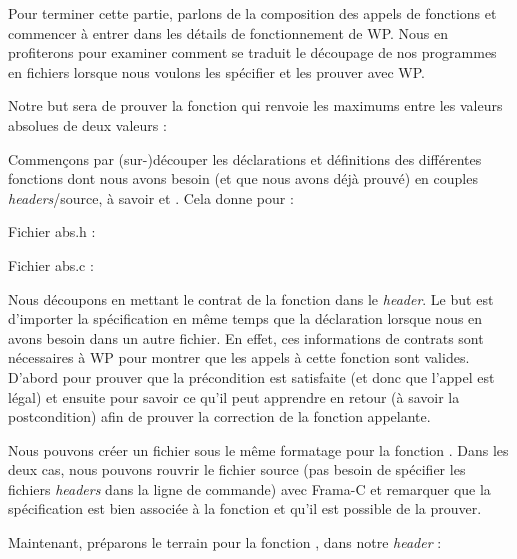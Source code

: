 Pour terminer cette partie, parlons de la composition des appels de
fonctions et commencer à entrer dans les détails de fonctionnement de WP. Nous
en profiterons pour examiner comment se traduit le découpage de nos
programmes en fichiers lorsque nous voulons les spécifier et les prouver avec WP.



Notre but sera de prouver la fonction  qui renvoie les maximums
entre les valeurs absolues de deux valeurs :






Commençons par (sur-)découper les déclarations et définitions des différentes
fonctions dont nous avons besoin (et que nous avons déjà prouvé) en couples
\textit{headers}/source, à savoir  et . Cela donne
pour  :



Fichier abs.h :



Fichier abs.c :




Nous découpons en mettant le contrat de la fonction dans le \textit{header}. Le
but est d'importer la spécification en même temps que la déclaration
lorsque nous en avons besoin dans un autre fichier. En effet, ces informations
de contrats sont nécessaires à WP pour montrer que les appels à cette
fonction sont valides. D'abord pour prouver que la précondition est satisfaite
(et donc que l'appel est légal) et ensuite pour savoir ce qu'il peut apprendre
en retour (à savoir la postcondition) afin de prouver la correction de la
fonction appelante.



Nous pouvons créer un fichier sous le même formatage pour la fonction .
Dans les deux cas, nous pouvons rouvrir le fichier source (pas besoin de
spécifier les fichiers \textit{headers} dans la ligne de commande) avec Frama-C et
remarquer que la spécification est bien associée à la fonction et qu'il est
possible de la prouver.



Maintenant, préparons le terrain pour la fonction , dans notre \textit{header} :







